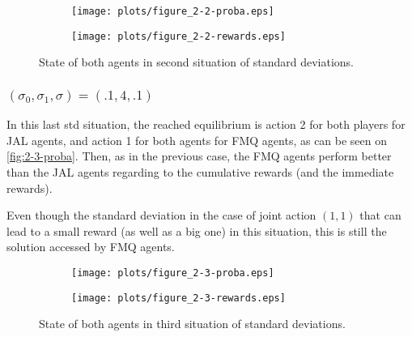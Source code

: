 \documentclass{article}
\begin{document}
\begin{figure}[!t]
\begin{subfigure}{\textwidth}
	\hspace{-2cm}
	\texttt{[image: plots/figure\_2-2-proba.eps]}
\end{subfigure}
\begin{subfigure}{\textwidth}
	\hspace{-2cm}
	\texttt{[image: plots/figure\_2-2-rewards.eps]}
\end{subfigure}
\caption{State of both agents in second situation of standard deviations.}
\end{figure}

\newpage
\subsubsection{$(\sigma_0, \sigma_1, \sigma) = (.1, 4, .1)$}

In this last std situation, the reached equilibrium is action 2 for both players for JAL agents, and action 1 for both agents
for FMQ agents, as can be seen on \autoref{fig:2-3-proba}. Then, as in the previous case, the FMQ agents perform better than the
JAL agents regarding to the cumulative rewards (and the immediate rewards).

Even though the standard deviation in the case of joint action $(1, 1)$ that can lead to a small reward (as well as a big one)
in this situation, this is still the solution accessed by FMQ agents.

\begin{figure}[!t]
\begin{subfigure}{\textwidth}
	\hspace{-2cm}
	\texttt{[image: plots/figure\_2-3-proba.eps]}
\end{subfigure}
\begin{subfigure}{\textwidth}
	\hspace{-2cm}
	\texttt{[image: plots/figure\_2-3-rewards.eps]}
\end{subfigure}
\caption{State of both agents in third situation of standard deviations.}
\end{figure}
\end{document}

